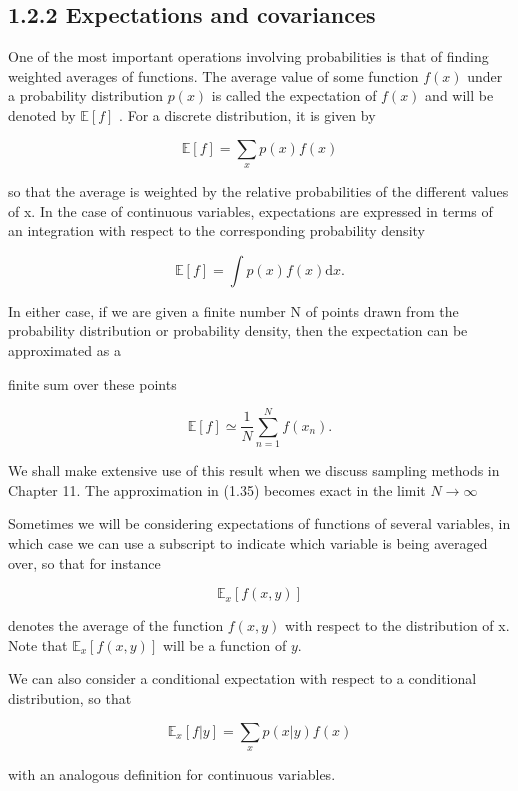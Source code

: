 \documentclass[
  10
]{article}
\begin{document}
\subsection{1.2.2 Expectations and
covariances}\label{expectations-and-covariances}

One of the most important operations involving probabilities is that of
finding weighted averages of functions. The average value of some
function \(f ( x )\) under a probability distribution \(p ( x )\) is
called the expectation of \(f ( x )\) and will be denoted by
\(\mathbb { E } [ f ]\) . For a discrete distribution, it is given by

\[
\mathbb {E} [ f ] = \sum_ {x} p (x) f (x)\tag{1.33}
\]

so that the average is weighted by the relative probabilities of the
different values of x. In the case of continuous variables, expectations
are expressed in terms of an integration with respect to the
corresponding probability density

\[
\mathbb {E} [ f ] = \int p (x) f (x) \mathrm{d} x.\tag{1.34}
\]

In either case, if we are given a finite number N of points drawn from
the probability distribution or probability density, then the
expectation can be approximated as a

finite sum over these points

\[
\mathbb {E} [ f ] \simeq \frac {1}{N} \sum_ {n = 1} ^ {N} f (x _ {n}).\tag{1.35}
\]

We shall make extensive use of this result when we discuss sampling
methods in Chapter 11. The approximation in (1.35) becomes exact in the
limit \(N \to \infty\)

Sometimes we will be considering expectations of functions of several
variables, in which case we can use a subscript to indicate which
variable is being averaged over, so that for instance

\[
\mathbb {E} _ {x} [ f (x, y) ]\tag{1.36}
\]

denotes the average of the function \(f ( x , y )\) with respect to the
distribution of x. Note that \(\mathbb { E } _ { x } [ f ( x , y ) ]\)
will be a function of \(y .\)

We can also consider a conditional expectation with respect to a
conditional distribution, so that

\[
\mathbb {E} _ {x} [ f | y ] = \sum_ {x} p (x | y) f (x)\tag{1.37}
\]

with an analogous definition for continuous variables.
\end{document}
